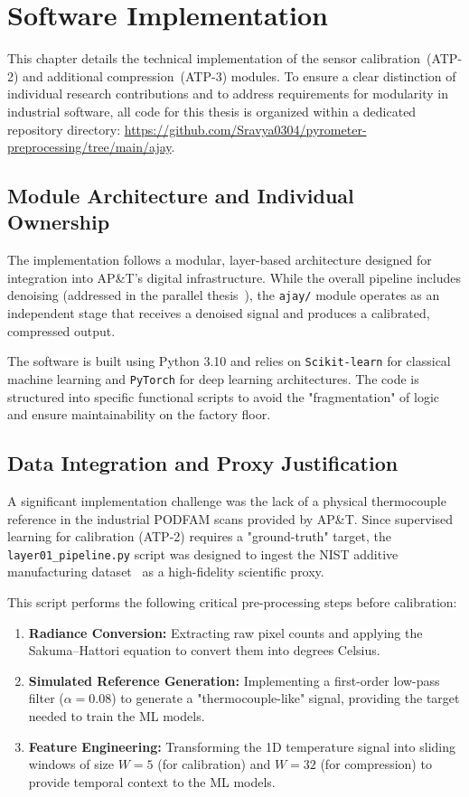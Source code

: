 \chapter{Software Implementation}
\label{cha:implementation}

This chapter details the technical implementation of the sensor calibration~(ATP-2) and additional compression~(ATP-3) modules. To ensure a clear distinction of individual research contributions and to address requirements for modularity in industrial software, all code for this thesis is organized within a dedicated repository directory: \url{https://github.com/Sravya0304/pyrometer-preprocessing/tree/main/ajay}.

\section{Module Architecture and Individual Ownership}
\label{sec:architecture}

The implementation follows a modular, layer-based architecture designed for integration into AP\&T's digital infrastructure. While the overall pipeline includes denoising (addressed in the parallel thesis~\cite{sravya2026}), the \texttt{ajay/} module operates as an independent stage that receives a denoised signal and produces a calibrated, compressed output. 

The software is built using Python 3.10 and relies on \texttt{Scikit-learn} for classical machine learning and \texttt{PyTorch} for deep learning architectures. The code is structured into specific functional scripts to avoid the "fragmentation" of logic and ensure maintainability on the factory floor.

\section{Data Integration and Proxy Justification}
\label{sec:preprocessing}

A significant implementation challenge was the lack of a physical thermocouple reference in the industrial PODFAM scans provided by AP\&T. Since supervised learning for calibration (ATP-2) requires a "ground-truth" target, the \texttt{layer01\_pipeline.py} script was designed to ingest the NIST additive manufacturing dataset~\cite{nist_dataset} as a high-fidelity scientific proxy. 

This script performs the following critical pre-processing steps before calibration:
\begin{enumerate}[leftmargin=2em]
    \item \textbf{Radiance Conversion:} Extracting raw pixel counts and applying the Sakuma--Hattori equation to convert them into degrees Celsius.
    \item \textbf{Simulated Reference Generation:} Implementing a first-order low-pass filter ($\alpha=0.08$) to generate a "thermocouple-like" signal, providing the target needed to train the ML models.
    \item \textbf{Feature Engineering:} Transforming the 1D temperature signal into sliding windows of size $W=5$ (for calibration) and $W=32$ (for compression) to provide temporal context to the ML models.
\end{enumerate}

